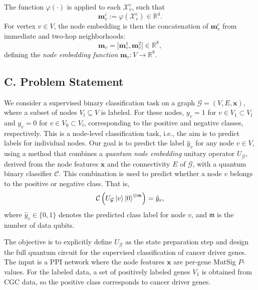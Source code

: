 \documentclass[
  reprint,
  superscriptaddress,
  amsmath,amssymb,
  aps,prl,
]{revtex4-2}
\begin{document}
\noindent The function \(\varphi(\cdot)\) is applied to each \(\mathcal{X}^c_v\), such that
\begin{equation}
\boldsymbol m^c_v := \varphi(\mathcal{X}^c_v) \in \mathbb{R}^4.
\end{equation}
\noindent For vertex \(v \in V\), the node embedding is then the concatenation of \(\boldsymbol m^c_v\) from immediate and two-hop neighborhoods:
\begin{equation}
\boldsymbol m_v = \bigl[ \boldsymbol m^1_v, \boldsymbol m^2_v \bigr] \in \mathbb{R}^8,
\label{eq:origin-moment-embedding-function}
\end{equation}
defining the \textit{node embedding function} \(\boldsymbol m_v: V \to \mathbb{R}^8\).

\subsection{C. Problem Statement}
%
%
%
\noindent We consider a supervised binary classification task on a graph \(\mathcal{G} = (V, E, \boldsymbol{x})\), where a subset of nodes \(V_l \subseteq V\) is labeled. For these nodes, \(y_v = 1\) for \(v \in V_1 \subset V_l\) and \(y_v = 0\) for \(v \in V_0 \subset V_l\), corresponding to the positive and negative classes, respectively. This is a node-level classification task, i.e., the aim is to predict labels for individual nodes. Our goal is to predict the label \(\hat y_v\) for any node \(v \in V\), using a method that combines a \textit{quantum node embedding} unitary operator \(U_\mathcal{G}\), derived from the node features \(\boldsymbol{x}\) and the connectivity \(E\) of \(\mathcal{G}\), with a quantum binary classifier \(\mathcal{C}\). This combination is used to predict whether a node \(v\) belongs to the positive or negative class. That is,
\begin{equation}
    \mathcal{C}\left(U_\mathcal{G}\ket{v} \ket{0}^{\otimes{\mathfrak m}} \right) = \hat{y}_v,
    \label{eq:goal}
\end{equation}
\noindent where \(\hat{y}_v\in\{0,1\}\) denotes the predicted class label for node \(v\), and \(\mathfrak m\) is the number of data qubits.

The objective is to explicitly define \(U_\mathcal G\) as the state preparation step and design the full quantum circuit for the supervised classification of cancer driver genes. The input is a PPI network where the node features \(\boldsymbol{x}\) are per-gene MutSig \(P\)-values. For the labeled data, a set of positively labeled genes \(V_1\) is obtained from CGC data, so the positive class corresponds to cancer driver genes.
\end{document}
